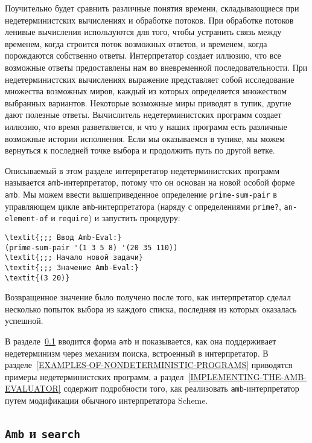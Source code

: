 Поучительно будет сравнить различные понятия времени,
складывающиеся при недетерминистских вычислениях и обработке потоков.  При 
обработке  потоков ленивые вычисления используются для того, чтобы устранить
связь между временем, когда строится поток возможных ответов, и
временем, когда порождаются собственно ответы. Интерпретатор
создает иллюзию, что все возможные ответы предоставлены нам во
вневременной последовательности.  При недетерминистских вычислениях
выражение представляет собой исследование множества возможных миров, каждый
из которых определяется множеством выбранных вариантов.  Некоторые
возможные миры приводят в тупик, другие дают полезные ответы.
Вычислитель недетерминистских программ создает иллюзию, что время
разветвляется, и что у наших программ есть различные возможные истории
исполнения.  Если мы оказываемся в тупике, мы можем вернуться к
последней точке выбора и продолжить путь по другой ветке.

Описываемый в этом разделе интерпретатор недетерминистских
программ называется {\tt amb}-интерпретатор, потому что он
основан на новой особой форме {\tt amb}.  Мы можем ввести
вышеприведенное определение {\tt prime-sum-pair} в управляющем
цикле {\tt amb}-интерпретатора (наряду с определениями
{\tt prime?}, {\tt an-element-of} и
{\tt require}) и запустить процедуру:

\begin{Verbatim}[fontsize=\small]
\textit{;;; Ввод Amb-Eval:}
(prime-sum-pair '(1 3 5 8) '(20 35 110))
\textit{;;; Начало новой задачи}
\textit{;;; Значение Amb-Eval:}
\textit{(3 20)}
\end{Verbatim}
Возвращенное значение было получено после того, как интерпретатор
сделал несколько попыток выбора из каждого списка, последняя из которых
оказалась успешной.

В разделе~\ref{AMB-AND-SEARCH} вводится форма
{\tt amb} и показывается, как она поддерживает недетерминизм
через механизм поиска, встроенный в интерпретатор.  В 
разделе~\ref{EXAMPLES-OF-NONDETERMINISTIC-PROGRAMS} приводятся
примеры недетерминистских программ, а 
раздел~\ref{IMPLEMENTING-THE-AMB-EVALUATOR} содержит подробности того,
как реализовать {\tt amb}-интерпретатор путем модификации
обычного интерпретатора Scheme.

\subsection{{\tt Amb} и {\tt search} }
\label{AMB-AND-SEARCH}%


